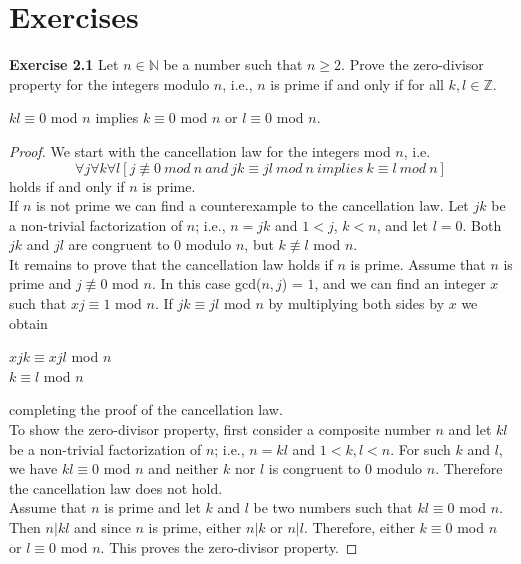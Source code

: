 \documentclass[a4paper]{article}
\begin{document}
\section{Exercises}
\noindent \textbf{Exercise 2.1} Let $n \in \mathbb{N}$ be a number such that $n \geq 2$. Prove the zero-divisor property for the integers modulo $n$, i.e., $n$ is prime if and only if for all $k, l \in \mathbb{Z}$.
\begin{center}
$kl \equiv 0$ mod $n$ implies $k \equiv 0$ mod $n$ or $l \equiv 0$ mod $n$.
\end{center}
\begin{proof}
We start with the cancellation law for the integers mod $n$, i.e.
$$ \forall j \forall k \forall l[j \not \equiv 0\ mod\ n\ and\ jk \equiv jl\ mod\ n\ implies\ k \equiv l\ mod\ n]$$
holds if and only if $n$ is prime. \\
If $n$ is not prime we can find a counterexample to the cancellation law. Let $jk$ be a non-trivial factorization of $n$; i.e., $n = jk$ and $1 < j$, $k < n$, and let $l = 0$. Both $jk$ and $jl$ are congruent to $0$ modulo $n$, but $k \not \equiv l$ mod $n$.\\
It remains to prove that the cancellation law holds if $n$ is prime. Assume that $n$ is prime and $j \not \equiv 0$ mod $n$. In this case gcd($n, j$) = $1$, and we can find an integer $x$ such that $xj \equiv 1$ mod $n$. If $jk \equiv jl$ mod $n$ by multiplying both sides by $x$ we obtain
\begin{center}
$xjk \equiv xjl$ mod $n$\\
$k \equiv l$ mod $n$
\end{center}
completing the proof of the cancellation law.\\
To show the zero-divisor property, first consider a composite number $n$ and let $kl$ be a non-trivial factorization of $n$; i.e., $n = kl$ and $1 < k, l <n$. For such $k$ and $l$, we have $kl \equiv 0$ mod $n$ and neither $k$ nor $l$ is congruent to $0$ modulo $n$. Therefore the cancellation law does not hold.\\
Assume that $n$ is prime and let $k$ and $l$ be two numbers such that $kl \equiv 0$ mod $n$. Then $n|kl$ and since $n$ is prime, either $n|k$ or $n|l$. Therefore, either $k \equiv 0$ mod $n$ or $l \equiv 0$ mod $n$. This proves the zero-divisor property.
\end{proof}
\end{document}
